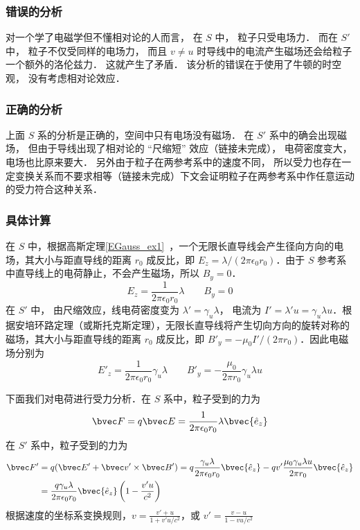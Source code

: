 \subsubsection{错误的分析}
对一个学了电磁学但不懂相对论的人而言， 在 $S$ 中， 粒子只受电场力． 而在 $S'$ 中， 粒子不仅受同样的电场力， 而且 $v \ne u$ 时导线中的电流产生磁场还会给粒子一个额外的洛伦兹力． 这就产生了矛盾． 该分析的错误在于使用了牛顿的时空观， 没有考虑相对论效应．

\subsubsection{正确的分析}
上面 $S$ 系的分析是正确的，空间中只有电场没有磁场． 在 $S'$ 系中的确会出现磁场， 但由于导线出现了相对论的 “尺缩短” 效应（链接未完成）， 电荷密度变大， 电场也比原来要大． 另外由于粒子在两参考系中的速度不同， 所以受力也存在一定变换关系而不要求相等（链接未完成）下文会证明粒子在两参考系中作任意运动的受力符合这种关系．

\subsubsection{具体计算}
在 $S$ 中，根据高斯定理\autoref{EGauss_ex1}~，一个无限长直导线会产生径向方向的电场，其大小与距直导线的距离 $r_0$ 成反比，即 $E_z=\lambda/(2\pi\epsilon_0r_0)$．由于 $S$ 参考系中直导线上的电荷静止，不会产生磁场，所以 $B_y=0$．
\begin{equation}
E_{z} = \frac{1}{2\pi\epsilon_0 r_0} \lambda
\qquad
B_{y} = 0
\end{equation}
在 $S'$ 中， 由尺缩效应，线电荷密度变为 $\lambda' = \gamma_u \lambda$， 电流为 $I' = \lambda' u = \gamma_u \lambda u$．根据安培环路定理（或斯托克斯定理），无限长直导线将产生切向方向的旋转对称的磁场，其大小与距直导线的距离 $r_0$ 成反比，即 $B'_y=-\mu_0 I' /(2\pi r_0)$．因此电磁场分别为
\begin{equation}
E'_z = \frac{1}{2\pi\epsilon_0 r_0} \gamma_u \lambda
\qquad
B'_y = -\frac{\mu_0}{2\pi r_0}\gamma_u \lambda u
\end{equation}

下面我们对电荷进行受力分析．在 $S$ 系中，粒子受到的力为
\begin{equation}
\bvec F=q\bvec E=\frac{1}{2\pi\epsilon_0 r_0}\lambda \bvec {\hat e_z}
\end{equation}
在 $S'$ 系中，粒子受到的力为
\begin{equation}
\begin{aligned}
\bvec F'&=q(\bvec E'+\bvec v'\times \bvec B')= q\frac{\gamma_u\lambda}{2\pi\epsilon_0 r_0} \bvec {\hat e_z}-qv'\frac{\mu_0\gamma_u \lambda u}{2\pi r_0} \bvec {\hat e_z}
\\
&=\frac{q\gamma_u\lambda}{2\pi\epsilon_0r_0}\bvec {\hat e_z}\left(1-\frac{v' u}{c^2}\right)
\end{aligned}
\end{equation}
根据速度的坐标系变换规则，$v=\frac{v'+u}{1+v'u/c^2}$，或 $v'=\frac{v-u}{1-vu/c^2}$

